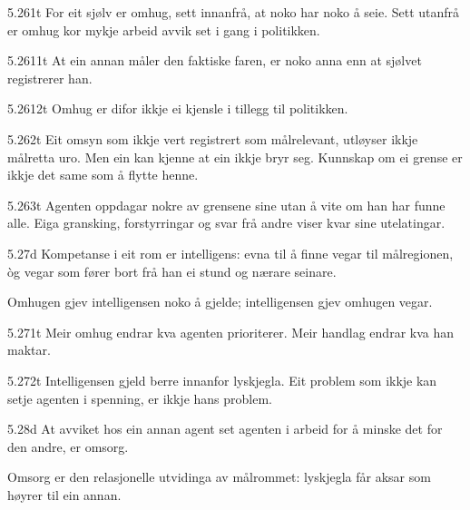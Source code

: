 \begin{formproposition}{5.261}{t}
For eit sjølv er omhug, sett innanfrå, at noko har noko å seie. Sett utanfrå er omhug kor mykje arbeid avvik set i gang i politikken.
\end{formproposition}

\begin{formproposition}{5.2611}{t}
At ein annan måler den faktiske faren, er noko anna enn at sjølvet registrerer han.
\end{formproposition}

\begin{formproposition}{5.2612}{t}
Omhug er difor ikkje ei kjensle i tillegg til politikken.
\end{formproposition}

\begin{formproposition}{5.262}{t}
Eit omsyn som ikkje vert registrert som målrelevant, utløyser ikkje målretta uro. Men ein kan kjenne at ein ikkje bryr seg. Kunnskap om ei grense er ikkje det same som å flytte henne.
\end{formproposition}

\begin{formproposition}{5.263}{t}
Agenten oppdagar nokre av grensene sine utan å vite om han har funne alle. Eiga gransking, forstyrringar og svar frå andre viser kvar sine utelatingar.
\end{formproposition}

\begin{formproposition}{5.27}{d}
Kompetanse i eit rom er intelligens: evna til å finne vegar til målregionen, òg vegar som fører bort frå han ei stund og nærare seinare.

Omhugen gjev intelligensen noko å gjelde; intelligensen gjev omhugen vegar.
\end{formproposition}

\begin{formproposition}{5.271}{t}
Meir omhug endrar kva agenten prioriterer. Meir handlag endrar kva han maktar.
\end{formproposition}

\begin{formproposition}{5.272}{t}
Intelligensen gjeld berre innanfor lyskjegla. Eit problem som ikkje kan setje agenten i spenning, er ikkje hans problem.
\end{formproposition}

\begin{formproposition}{5.28}{d}
At avviket hos ein annan agent set agenten i arbeid for å minske det for den andre, er omsorg.

Omsorg er den relasjonelle utvidinga av målrommet: lyskjegla får aksar som høyrer til ein annan.
\end{formproposition}

